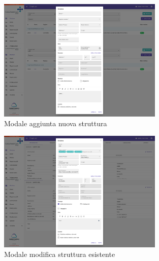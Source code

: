 

\begin{figure}[H]
    \centering
    \includegraphics[width= 0.7\textwidth]{images/capitolo5/f1_f2_f3_websiteVisibility_email_links/ModalFacility_create.png} 
    \caption{Modale aggiunta nuova struttura} 
    \label{fig:ModalFacility_create}
\end{figure}

\begin{figure}[H]
    \centering
    \includegraphics[width= 0.7\textwidth]{images/capitolo5/f1_f2_f3_websiteVisibility_email_links/ModalFacility_edit.png} 
    \caption{Modale modifica struttura esistente} 
    \label{fig:ModalFacility_edit}
\end{figure}

